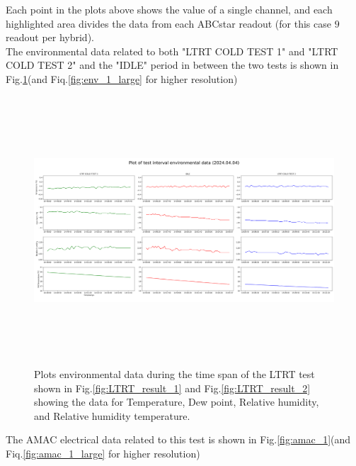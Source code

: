 \begin{figure}[h]
\end{figure}

Each point in the plots above shows the value of a single channel, and each highlighted area divides the data from each ABCstar readout (for this case $9$ readout per hybrid).\\

The environmental data related to both "LTRT COLD TEST 1" and "LTRT COLD TEST 2" and the "IDLE" period in between the two tests is shown in Fig.\ref{fig:env_1}(and Fiq.\ref{fig:env_1_large} for higher resolution)

\begin{figure}[h]
    \centering
    \includegraphics[width=12cm,height=10cm,keepaspectratio]{Figures/results/env_plot_20240404.png}
    \caption{Plots environmental data during the time span of the LTRT test shown in Fig.\ref{fig:LTRT_result_1} and Fig.\ref{fig:LTRT_result_2} showing the data for Temperature, Dew point, Relative humidity, and Relative humidity temperature.}
    \label{fig:env_1}
\end{figure}

The AMAC electrical data related to this test is shown in Fig.\ref{fig:amac_1}(and Fiq.\ref{fig:amac_1_large} for higher resolution)

